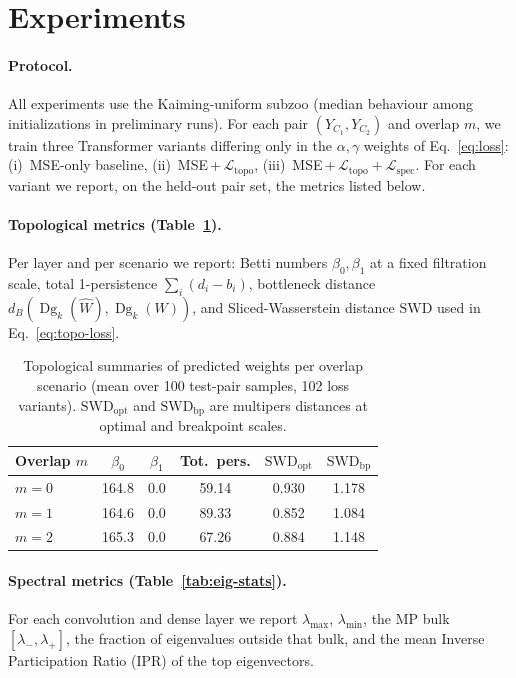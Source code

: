 \documentclass{article}
\newcommand{\SWD}{\mathrm{SWD}}
\newcommand{\Dg}{\operatorname{Dg}}
\begin{document}
\section{Experiments}
\label{sec:exp}

\paragraph{Protocol.}
All experiments use the Kaiming-uniform subzoo (median behaviour among
initializations in preliminary runs).  For each pair $(Y_{C_1},Y_{C_2})$
and overlap $m$, we train three Transformer variants differing only in the
$\alpha,\gamma$ weights of Eq.~\eqref{eq:loss}: (i)~MSE-only baseline,
(ii)~MSE\,+\,$\mathcal{L}_{\text{topo}}$, (iii)~MSE\,+\,$\mathcal{L}_{\text{topo}}+\mathcal{L}_{\text{spec}}$.
For each variant we report, on the held-out pair set, the metrics listed
below.

\paragraph{Topological metrics (Table~\ref{tab:topo-metrics}).}
Per layer and per scenario we report: Betti numbers
$\beta_0,\beta_1$ at a fixed filtration scale, total 1-persistence
$\sum_i(d_i-b_i)$, bottleneck distance $d_B(\Dg_k(\hat W),\Dg_k(W))$, and
Sliced-Wasserstein distance $\SWD$ used in
Eq.~\eqref{eq:topo-loss}.

\begin{table}[t]
  \centering
  \caption{Topological summaries of predicted weights per overlap scenario
  (mean over 100 test-pair samples, 102 loss variants).  $\SWD_{\text{opt}}$
  and $\SWD_{\text{bp}}$ are multipers distances at optimal and breakpoint scales.}
  \label{tab:topo-metrics}
  \begin{tabular}{lccccc}
    \toprule
    Overlap $m$ & $\beta_0$ & $\beta_1$ & Tot.~pers. & $\SWD_{\text{opt}}$ & $\SWD_{\text{bp}}$ \\
    \midrule
    $m=0$ & 164.8 & 0.0 & 59.14 & 0.930 & 1.178 \\
    $m=1$ & 164.6 & 0.0 & 89.33 & 0.852 & 1.084 \\
    $m=2$ & 165.3 & 0.0 & 67.26 & 0.884 & 1.148 \\
    \bottomrule
  \end{tabular}
\end{table}

\paragraph{Spectral metrics (Table~\ref{tab:eig-stats}).}
For each convolution and dense layer we report
$\lambda_{\max}$, $\lambda_{\min}$, the MP bulk
$[\lambda_-,\lambda_+]$, the fraction of eigenvalues outside that bulk,
and the mean Inverse Participation Ratio (IPR) of the top eigenvectors.
\end{document}
